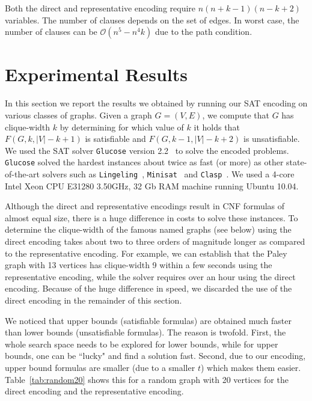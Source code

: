 \documentclass[10pt,usletter]{article}
\theoremstyle{remark}
\begin{document}
Both the direct and representative encoding require $n(n + k - 1)(n -
k + 2)$ variables.  The number of clauses depends on the set of edges. In
worst case, the number of clauses can be $\mathcal{O}(n^5 - n^4k)$ due
to the path condition.  





\section{Experimental Results}

In this section we report the results we obtained by running our SAT
encoding on various classes of graphs.  Given a graph $G= (V,E)$, we
compute that $G$ has clique-width $k$ by determining for which value
of $k$ it holds that $F(G,k, |V| - k + 1 )$ is satisfiable and $F(G,k-1,
|V| - k + 2)$ is unsatisfiable.
We used the SAT solver {\tt Glucose} version 2.2~\cite{Glucose}  to solve the encoded problems. 
{\tt Glucose} solved the hardest instances about twice as fast (or more) as 
other state-of-the-art solvers such as {\tt Lingeling}~\cite{Biere12}, {\tt Minisat}~\cite{Minisat} and {\tt Clasp}~\cite{Clasp}.
We used a 4-core Intel Xeon CPU E31280 3.50GHz,
32 Gb RAM machine running Ubuntu 10.04.


Although the direct and representative encodings result
in CNF formulas of almost equal size, there is a huge difference in
 costs to solve these instances. To determine the
clique-width of the famous named graphs (see below)
using the direct encoding takes about two to three orders of magnitude
longer as compared to the representative encoding.  For example, we can
establish that the Paley graph with 13 vertices has clique-width 9
within a few seconds using the representative encoding, while the
solver requires over an hour using the direct encoding. Because of the
huge difference in speed, we discarded the use of the direct encoding
in the remainder of this section.


We noticed that upper bounds (satisfiable formulas) are obtained
much faster than lower bounds (unsatisfiable formulas). The
reason is twofold.  First,  the whole search space
needs to be explored for lower bounds, while for upper bounds, one can be ``lucky"
and find a solution fast. Second, due to our encoding, upper bound
formulas are smaller (due to a smaller $t$) which makes them
easier. Table~\ref{tab:random20} shows this for a random graph with 20
vertices for the direct encoding and the representative
encoding. 
\end{document}
